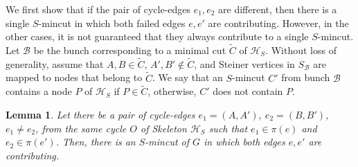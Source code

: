 \documentclass[letterpaper,11pt]{article}
\newtheorem{lemma}{Lemma}[]
\begin{document}
We first show that if the pair of cycle-edges $e_1,e_2$ are different, then there is a single $S$-mincut in which both failed edges $e,e'$ are contributing.  
However, in the other cases, it is not guaranteed that they always contribute to a single $S$-mincut. Let ${\mathcal B}$ be the bunch corresponding to a minimal cut $\tilde C$ of ${\mathcal H}_S$. Without loss of generality, assume that $A,B\in \tilde C$, $A',B'\notin \tilde C$, and Steiner vertices in $S_{\mathcal B}$ are mapped to nodes that belong to $\tilde C$. We say that an $S$-mincut $C'$ from bunch ${\mathcal B}$ contains a node $P$ of ${\mathcal H}_S$ if $P\in \tilde C$, otherwise, $C'$ does not contain $P$.
\begin{lemma} \label{lem : different cycle edges}
    Let there be a pair of cycle-edges $e_1=(A,A'),~e_2=(B,B')$, $e_1\ne e_2$, from the same cycle $O$ of Skeleton ${\mathcal H}_S$ such that $e_1\in \pi(e)$ and $e_2\in \pi(e')$. Then, there is an $S$-mincut of $G$ in which both edges $e,e'$ are contributing. 
\end{lemma}
\end{document}
